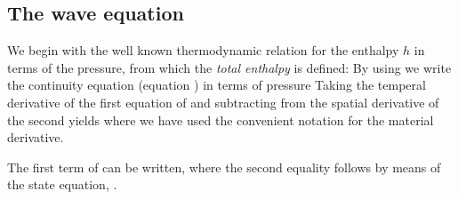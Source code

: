 \subsection{The wave equation}
We begin with the well known thermodynamic relation for the enthalpy $h$ in terms of the pressure,
from which the {\em total enthalpy} is defined:
By using  we write the continuity equation (equation ) in terms of pressure
Taking the temperal derivative of the first equation of  and subtracting from the spatial derivative of the second yields
where we have used the convenient notation
for the material derivative.


The first term of  can be written,
where the second equality follows by means of the state equation, .

